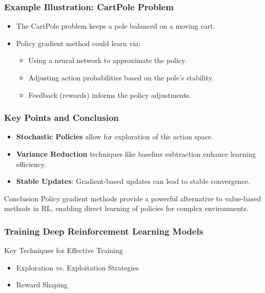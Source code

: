 \documentclass[aspectratio=169]{beamer}
\begin{document}
\begin{frame}[fragile]
    \frametitle{Example Illustration: CartPole Problem}
    \begin{itemize}
        \item The CartPole problem keeps a pole balanced on a moving cart.
        \item Policy gradient method could learn via:
            \begin{itemize}
                \item Using a neural network to approximate the policy.
                \item Adjusting action probabilities based on the pole's stability.
                \item Feedback (rewards) informs the policy adjustments.
            \end{itemize}
    \end{itemize}
\end{frame}

\begin{frame}[fragile]
    \frametitle{Key Points and Conclusion}
    \begin{itemize}
        \item \textbf{Stochastic Policies} allow for exploration of the action space.
        \item \textbf{Variance Reduction} techniques like baseline subtraction enhance learning efficiency.
        \item \textbf{Stable Updates}: Gradient-based updates can lead to stable convergence.
    \end{itemize}
    
    \begin{block}{Conclusion}
        Policy gradient methods provide a powerful alternative to value-based methods in RL,
        enabling direct learning of policies for complex environments.
    \end{block}
\end{frame}

\begin{frame}[fragile]
    \frametitle{Training Deep Reinforcement Learning Models}
    \begin{block}{Key Techniques for Effective Training}
        \begin{itemize}
            \item Exploration vs. Exploitation Strategies
            \item Reward Shaping
        \end{itemize}
    \end{block}
\end{frame}
\end{document}
